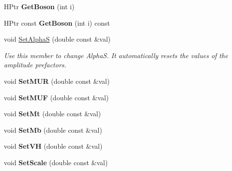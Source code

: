 \begin{DoxyCompactItemize}
\item 
\hypertarget{classHiggsModel_afa9a44f6a2bd358d887acd5771253953}{}H\+Ptr {\bfseries Get\+Boson} (int i)\label{classHiggsModel_afa9a44f6a2bd358d887acd5771253953}

\item 
\hypertarget{classHiggsModel_ae082694ec944cffd807f4f0a20bf931b}{}H\+Ptr const {\bfseries Get\+Boson} (int i) const \label{classHiggsModel_ae082694ec944cffd807f4f0a20bf931b}

\item 
\hypertarget{classHiggsModel_a5a3f7171856b2106141948544fc49f13}{}void \hyperlink{classHiggsModel_a5a3f7171856b2106141948544fc49f13}{Set\+Alpha\+S} (double const \&val)\label{classHiggsModel_a5a3f7171856b2106141948544fc49f13}

\begin{DoxyCompactList}\small\item\em Use this member to change Alpha\+S. It automatically resets the values of the amplitude prefactors. \end{DoxyCompactList}\item 
\hypertarget{classHiggsModel_a40b498b2555458a9abc4ea989e72ce91}{}void {\bfseries Set\+M\+U\+R} (double const \&val)\label{classHiggsModel_a40b498b2555458a9abc4ea989e72ce91}

\item 
\hypertarget{classHiggsModel_a8e8772814f7441352b226eb0566a263e}{}void {\bfseries Set\+M\+U\+F} (double const \&val)\label{classHiggsModel_a8e8772814f7441352b226eb0566a263e}

\item 
\hypertarget{classHiggsModel_a511bd13bf20268e59567b2049d7a5781}{}void {\bfseries Set\+Mt} (double const \&val)\label{classHiggsModel_a511bd13bf20268e59567b2049d7a5781}

\item 
\hypertarget{classHiggsModel_a460c285dbbd117c30be6ea43f5271e2d}{}void {\bfseries Set\+Mb} (double const \&val)\label{classHiggsModel_a460c285dbbd117c30be6ea43f5271e2d}

\item 
\hypertarget{classHiggsModel_a058daf0cc3b8cad4077419d19d8e4c21}{}void {\bfseries Set\+V\+H} (double const \&val)\label{classHiggsModel_a058daf0cc3b8cad4077419d19d8e4c21}

\item 
\hypertarget{classHiggsModel_aaca4ad2dcfd40c87e76fc88ab95b56dc}{}void {\bfseries Set\+Scale} (double const \&val)\label{classHiggsModel_aaca4ad2dcfd40c87e76fc88ab95b56dc}


\end{DoxyCompactItemize}
